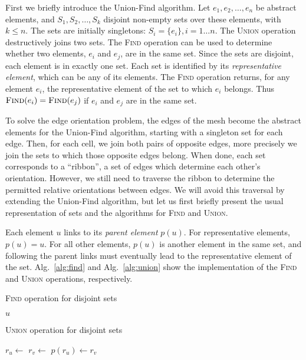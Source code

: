 \documentclass[oneeqnum,onethmnum,onefignum,onetabnum]{siamltex1213}
\begin{document}
First we briefly introduce the Union-Find algorithm. Let $ e_1,
e_2, \ldots, e_n $ be abstract elements, and $ S_1, S_2, \ldots, S_k $
disjoint non-empty sets over these elements, with $k \le n$. The sets are
initially singletons: $ S_i = \{ e_i \}, i = 1\ldots{}n $.
The \textsc{Union} operation destructively joins two sets.
The \textsc{Find} operation can be used to determine whether two elements,
$ e_i $ and $ e_j $, are in the same set.
Since the sets are disjoint, each element is in exactly one set.
Each set is identified by its \emph{representative element}, which can
be any of its elements.
The \textsc{Find} operation returns, for any element $ e_i $, the
representative element of the set to which $ e_i $ belongs.
Thus $ \textsc{Find}(e_i) = \textsc{Find}(e_j) $ if $ e_i $
and $ e_j $ are in the same set.

To solve the edge orientation problem, the edges of the mesh become the
abstract elements for the Union-Find algorithm, starting with a singleton
set for each edge. Then, for each cell, we join both pairs of opposite
edges, more precisely we join the sets to which those opposite edges
belong. When done, each set corresponds to a ``ribbon'', a set of edges
which determine each other's orientation.  However, we still need to
traverse the ribbon to determine the permitted relative orientations between
edges.  We will avoid this traversal by extending the Union-Find algorithm,
but let us first briefly present the usual representation of sets and the
algorithms for \textsc{Find} and \textsc{Union}.

Each element $ u $ links to its \emph{parent element} $ p(u) $.
For representative elements, $ p(u) = u $.
For all other elements, $ p(u) $ is another element in the same set,
and following the parent links must eventually lead to the
representative element of the set.
Alg.~\ref{alg:find} and Alg.~\ref{alg:union} show the implementation of the
\textsc{Find} and \textsc{Union} operations, respectively.

\begin{algorithm}
  \caption{\textsc{Find} operation for disjoint sets}
  \label{alg:find}
  \begin{algorithmic}[1]
      \State \Return $ u $
    \Else
      \State \Return {}
    \EndIf
    \EndFunction
  \end{algorithmic}
\end{algorithm}

\begin{algorithm}
  \caption{\textsc{Union} operation for disjoint sets}
  \label{alg:union}
  \begin{algorithmic}[1]
    \State $ r_u \gets $ 
    \State $ r_v \gets $ 
      \State $ p(r_u) \gets r_v $
    \EndIf
    \EndProcedure
  \end{algorithmic}
\end{algorithm}
\end{document}
